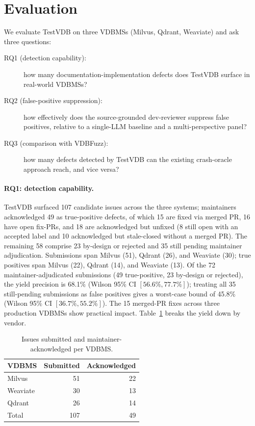 \documentclass[sigconf]{acmart}
\begin{document}
\section{Evaluation}
\label{sec:eval}

We evaluate TestVDB on three VDBMSs (Milvus, Qdrant, Weaviate) and ask three questions:
\begin{description}
  \item[RQ1 (detection capability):] how many documentation-implementation defects does TestVDB surface in real-world VDBMSs?
  \item[RQ2 (false-positive suppression):] how effectively does the source-grounded dev-reviewer suppress false positives, relative to a single-LLM baseline and a multi-perspective panel?
  \item[RQ3 (comparison with VDBFuzz):] how many defects detected by TestVDB can the existing crash-oracle approach reach, and vice versa?
\end{description}

\paragraph{RQ1: detection capability.}
TestVDB surfaced 107 candidate issues across the three systems; maintainers acknowledged 49 as true-positive defects, of which 15 are fixed via merged PR, 16 have open fix-PRs, and 18 are acknowledged but unfixed (8 still open with an accepted label and 10 acknowledged but stale-closed without a merged PR). The remaining 58 comprise 23 by-design or rejected and 35 still pending maintainer adjudication. Submissions span Milvus (51), Qdrant (26), and Weaviate (30); true positives span Milvus (22), Qdrant (14), and Weaviate (13). Of the 72 maintainer-adjudicated submissions (49 true-positive, 23 by-design or rejected), the yield precision is 68.1\% (Wilson 95\% CI $[56.6\%, 77.7\%]$); treating all 35 still-pending submissions as false positives gives a worst-case bound of 45.8\% (Wilson 95\% CI $[36.7\%, 55.2\%]$). The 15 merged-PR fixes across three production VDBMSs show practical impact. Table~\ref{tab:yield} breaks the yield down by vendor.

\begin{table}[t]
\caption{Issues submitted and maintainer-acknowledged per VDBMS.}
\label{tab:yield}
\small
\begin{tabular}{@{}lrr@{}}
\toprule
VDBMS & Submitted & Acknowledged \\
\midrule
Milvus & 51 & 22 \\
Weaviate & 30 & 13 \\
Qdrant & 26 & 14 \\
\midrule
Total & 107 & 49 \\
\bottomrule
\end{tabular}
\end{table}
\end{document}
